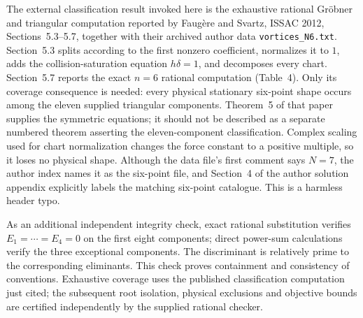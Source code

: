 \documentclass[11pt]{article}
\theoremstyle{remark}
\numberwithin{equation}{section}
\begin{document}
The external classification result invoked here is the exhaustive rational
Gr\"obner and triangular computation reported by Faug\`ere and Svartz,
ISSAC 2012, Sections~5.3--5.7, together with their archived author data
\texttt{vortices\_N6.txt}. Section~5.3 splits according to the first nonzero
coefficient, normalizes it to $1$, adds the collision-saturation equation
$h\delta=1$, and decomposes every chart. Section~5.7 reports the exact
$n=6$ rational computation (Table~4). Only its coverage consequence is
needed: every physical stationary six-point shape occurs among the
eleven supplied triangular components. Theorem~5 of that paper supplies
the symmetric equations; it should not be described as a separate numbered
theorem asserting the eleven-component classification.
Complex scaling used for chart normalization changes the force constant
to a positive multiple, so it loses no physical shape. Although the data
file's first comment says $N=7$, the author index names it as the six-point
file, and Section~4 of the author solution appendix explicitly labels the
matching six-point catalogue. This is a harmless header typo.

As an additional independent integrity check, exact rational substitution
verifies $E_1=\cdots=E_4=0$ on the first eight components; direct
power-sum calculations verify the three exceptional components.
The discriminant is relatively prime to the corresponding eliminants.
This check proves containment and consistency of conventions. Exhaustive
coverage uses the published classification computation just cited;
the subsequent root isolation, physical exclusions and objective bounds
are certified independently by the supplied rational checker.
\end{document}
